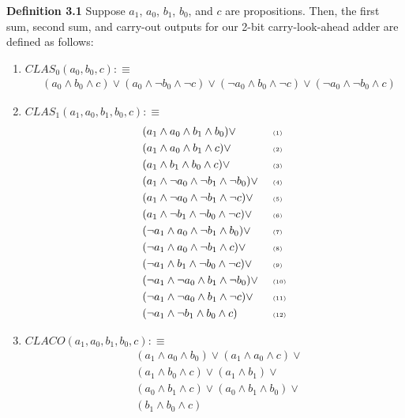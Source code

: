 \documentclass{article}
\begin{document}
\noindent \textbf{Definition 3.1} Suppose $a_1$, $a_0$, $b_1$, $b_0$, and $c$ are propositions. Then, the first sum, second sum, and carry-out outputs for our 2-bit carry-look-ahead adder are defined as follows: 
\begin{enumerate}
	\item 
	$ CLAS_0(a_0, b_0, c) :\equiv $
	\begin{align*}  
	&(a_0 \land b_0 \land c) \lor 
	   (a_0 \land \lnot b_0 \land \lnot c) \lor 
	   (\lnot a_0 \land b_0 \land \lnot c) \lor
	   (\lnot a_0 \land \lnot b_0 \land c)
	\end{align*}
	
 	\item
 	$ CLAS_1(a_1, a_0, b_1, b_0, c) :\equiv $
 	\begin{align*}   
	& (a_1 \land a_0 \land b_1 \land b_0)  \lor  && \text{ \tiny (1)} \\
	& (a_1 \land a_0 \land b_1 \land c) \lor && \text{ \tiny (2)} \\ 
	& (a_1 \land b_1 \land b_0 \land c) \lor  && \text{ \tiny (3)} \\
	& (a_1 \land \lnot a_0 \land \lnot b_1 \land \lnot b_0) \lor  && \text{ \tiny (4)} \\
	& (a_1 \land \lnot a_0 \land \lnot b_1 \land \lnot c) \lor  && \text{ \tiny (5)} \\
	& (a_1 \land \lnot b_1 \land \lnot  b_0 \land \lnot c) \lor  && \text{ \tiny (6)} \\
	& (\lnot a_1 \land a_0 \land \lnot b_1 \land b_0) \lor  && \text{ \tiny (7)} \\
	& (\lnot a_1 \land a_0 \land \lnot b_1 \land c) \lor  && \text{ \tiny (8)} \\
	& (\lnot a_1 \land b_1 \land \lnot b_0 \land \lnot c) \lor  && \text{ \tiny (9)} \\
	& (\lnot a_1 \land \lnot a_0 \land b_1 \land \lnot b_0) \lor && \text{ \tiny (10)} \\
	& (\lnot a_1 \land \lnot a_0 \land b_1 \land \lnot c) \lor  && \text{ \tiny (11)} \\
	& (\lnot a_1 \land \lnot b_1 \land b_0 \land c) && \text{ \tiny (12)}
	\end{align*}
\newpage
	\item 
	$ CLACO(a_1, a_0, b_1, b_0, c) :\equiv $
	\begin{align*} 
	 & (a_1 \land a_0 \land b_0) \lor
	   	 (a_1 \land a_0 \land c) \lor \\
	 & (a_1 \land b_0 \land c) \lor 
	 	 (a_1 \land b_1) \lor \\
	 &  (a_0 \land b_1 \land c) \lor 
	     (a_0 \land b_1 \land b_0) \lor \\
	 & (b_1 \land b_0 \land c) 
	\end{align*}
	   
\end{enumerate}
\end{document}
